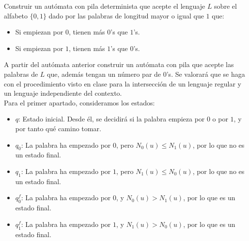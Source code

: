 \documentclass[12pt]{article}
\begin{document}
    \begin{ejercicio}[2.5 puntos]
        Construir un autómata con pila determinista que acepte el lenguaje $L$ sobre el alfabeto $\{0, 1\}$ dado por las palabras de
        longitud mayor o igual que $1$ que:
        \begin{itemize}
            \item Si empiezan por $0$, tienen más $0$'s que $1$'s.
            \item Si empiezan por $1$, tienen más $1$'s que $0$'s.
        \end{itemize}
        A partir del autómata anterior construir un autómata con pila que acepte las palabras de $L$ que, además tengan un número par de $0$'s. Se valorará que se haga con el procedimiento visto en clase para la intersección de un lenguaje regular y un lenguaje independiente del contexto.\\

        Para el primer apartado, consideramos los estados:
        \begin{itemize}
            \item $q$: Estado inicial. Desde él, se decidirá si la palabra empieza por $0$ o por $1$, y por tanto qué camino tomar.
            \item $q_0$: La palabra ha empezado por $0$, pero $N_0(u)\leq N_1(u)$, por lo que no es un estado final.
            \item $q_1$: La palabra ha empezado por $1$, pero $N_1(u)\leq N_0(u)$, por lo que no es un estado final.
            \item $q_0^f$: La palabra ha empezado por $0$, y $N_0(u)>N_1(u)$, por lo que es un estado final.
            \item $q_1^f$: La palabra ha empezado por $1$, y $N_1(u)>N_0(u)$, por lo que es un estado final.
        \end{itemize}
        

\end{ejercicio}
\end{document}
